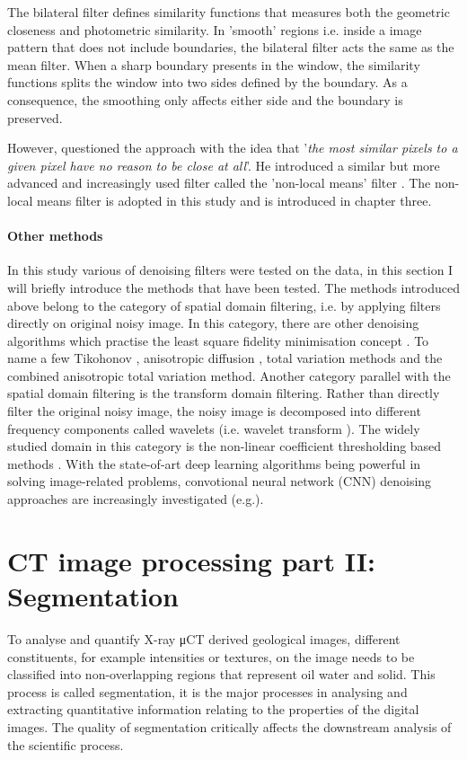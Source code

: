 The bilateral filter defines similarity functions that measures both the geometric closeness and photometric similarity. In 'smooth' regions i.e. inside a image pattern that does not include boundaries, the bilateral filter acts the same as the mean filter. When a sharp boundary presents in the window, the similarity functions splits the window into two sides defined by the boundary. As a consequence, the smoothing only affects either side and the boundary is preserved.

However, \citet{buades2011non} questioned the approach with the idea that '\textit{the most similar pixels to a given pixel have no reason to be close at all}'. He introduced a similar but more advanced and increasingly used filter called the 'non-local means' filter \citep{buades2011non}. The non-local means filter is adopted in this study and is introduced in chapter three.

\paragraph{Other methods}
In this study various of denoising filters were tested on the data, in this section I will briefly introduce the methods that have been tested. The methods introduced above belong to the category of spatial domain filtering, i.e. by applying filters directly on original noisy image. In this category, there are other denoising algorithms which practise the least square fidelity minimisation concept \citep{yan2011new, yan2011power,yan2012smoothed}. To name a few Tikohonov \citep{tikhonov1978methods}, anisotropic diffusion \citep{perona1990scale}, total variation \citep{chambolle2004algorithm} methods and the combined anisotropic total variation \citep{rudin1992nonlinear} method. Another category parallel with the spatial domain filtering is the transform domain filtering. Rather than directly filter the original noisy image, the noisy image is decomposed into different frequency components called wavelets (i.e. wavelet transform \citep{mallat1989theory}). The widely studied domain in this category is the non-linear coefficient thresholding based methods \citep{mallat1989theory}. With the state-of-art deep learning algorithms being powerful in solving image-related problems, convotional neural network (CNN) denoising approaches are increasingly investigated (e.g.\citep{kang2017deep,chen2017low,chen2017low2,gondara2016medical}).


\section{CT image processing part II: Segmentation}
To analyse and quantify X-ray μCT derived geological images, different constituents, for example intensities or textures, on the image needs to be classified into non-overlapping regions that represent oil water and solid. This process is called segmentation, it is the major processes in analysing and extracting quantitative information relating to the properties of the digital images. The quality of segmentation critically affects the downstream analysis of the scientific process.

